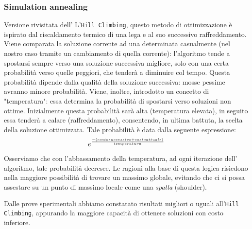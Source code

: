 			\subsubsection{Simulation annealing}
				Versione rivisitata dell' L'\texttt{Hill Climbing}, questo metodo di ottimizzazione è ispirato dal riscaldamento termico di una lega e al suo successivo raffreddamento. Viene comparata la soluzione corrente ad una determinata casualmente (nel nostro caso tramite un cambiamento di quella corrente): l'algoritmo tende a spostarsi sempre verso una soluzione successiva migliore, solo con una certa probabilità verso quelle peggiori, che tenderà a diminuire col tempo. Questa probabilità dipende dalla qualità della soluzione successiva: mosse pessime avranno minore probabilità. Viene, inoltre, introdotto un concetto di "temperatura": essa determina la probabilità di spostarsi verso soluzioni non ottime. Inizialmente questa probabilità sarà alta (temperatura elevata), in seguito essa tenderà a calare (raffreddamento), consentendo, in ultima battuta, la scelta della soluzione ottimizzata. Tale probabilità è data dalla seguente espressione:
				\begin{equation*}
				{\LARGE e^{\frac{-(costosuccessivo+costoattuale)}{temperatura}}}
				\end{equation*}
				Osserviamo che con l'abbassamento della temperatura, ad ogni iterazione dell' algoritmo, tale probabilità decresce.
				Le ragioni alla base di questa logica risiedono nella maggiore possibilità di trovare un massimo globale, evitando che ci si possa assestare su un punto di massimo locale come una \emph{spalla} (shoulder).\par
				Dalle prove sperimentali abbiamo constatato risultati migliori o uguali all'\texttt{Hill Climbing}, appurando la maggiore capacità di ottenere soluzioni con costo inferiore.
				
